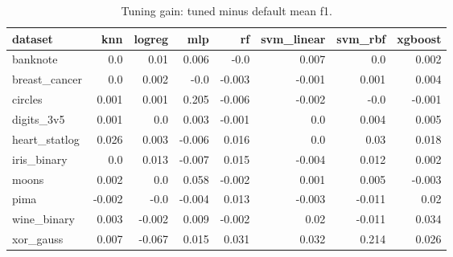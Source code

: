 \begin{table}[ht]
\centering
\caption{Tuning gain: tuned minus default mean f1.}
\label{tab:e1-delta-f1}
\begin{tabular}{lrrrrrrr}
\toprule
dataset & knn & logreg & mlp & rf & svm\_linear & svm\_rbf & xgboost \\
\midrule
banknote & 0.0 & 0.01 & 0.006 & -0.0 & 0.007 & 0.0 & 0.002 \\
breast\_cancer & 0.0 & 0.002 & -0.0 & -0.003 & -0.001 & 0.001 & 0.004 \\
circles & 0.001 & 0.001 & 0.205 & -0.006 & -0.002 & -0.0 & -0.001 \\
digits\_3v5 & 0.001 & 0.0 & 0.003 & -0.001 & 0.0 & 0.004 & 0.005 \\
heart\_statlog & 0.026 & 0.003 & -0.006 & 0.016 & 0.0 & 0.03 & 0.018 \\
iris\_binary & 0.0 & 0.013 & -0.007 & 0.015 & -0.004 & 0.012 & 0.002 \\
moons & 0.002 & 0.0 & 0.058 & -0.002 & 0.001 & 0.005 & -0.003 \\
pima & -0.002 & -0.0 & -0.004 & 0.013 & -0.003 & -0.011 & 0.02 \\
wine\_binary & 0.003 & -0.002 & 0.009 & -0.002 & 0.02 & -0.011 & 0.034 \\
xor\_gauss & 0.007 & -0.067 & 0.015 & 0.031 & 0.032 & 0.214 & 0.026 \\
\bottomrule
\end{tabular}
\end{table}
